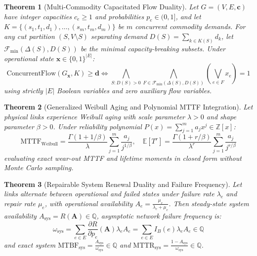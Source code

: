 \documentclass[10pt,journal,compsoc]{IEEEtran}
\newtheorem{theorem}{Theorem}
\begin{document}
\begin{theorem}[Multi-Commodity Capacitated Flow Duality]
Let $G = (V, E, \mathbf{c})$ have integer capacities $c_e \ge 1$ and probabilities $p_e \in (0, 1]$, and let $K = \{(s_1, t_1, d_1), \dots, (s_m, t_m, d_m)\}$ be $m$ concurrent commodity demands. For any cut partition $(S, V \setminus S)$ separating demand $D(S) = \sum_{k \in K(S)} d_k$, let $\mathcal{F}_{\text{min}}(\Delta(S), D(S))$ be the minimal capacity-breaking subsets. Under operational state $\mathbf{x} \in \{0, 1\}^{|E|}$:
\begin{equation}
\text{ConcurrentFlow}(G_{\mathbf{x}}, K) \ge \mathbf{d} \iff \bigwedge_{S: D(S) > 0} \bigwedge_{F \in \mathcal{F}_{\text{min}}(\Delta(S), D(S))} \left( \bigvee_{e \in F} x_e \right) = 1
\end{equation}
using strictly $|E|$ Boolean variables and zero auxiliary flow variables.
\end{theorem}

\begin{theorem}[Generalized Weibull Aging and Polynomial MTTF Integration]
Let physical links experience Weibull aging with scale parameter $\lambda > 0$ and shape parameter $\beta > 0$. Under reliability polynomial $P(x) = \sum_{j=1}^m a_j x^j \in \mathbb{Z}[x]$:
\begin{equation}
\text{MTTF}_{\text{Weibull}} = \frac{\Gamma(1 + 1/\beta)}{\lambda} \sum_{j=1}^m \frac{a_j}{j^{1/\beta}}, \quad \mathbb{E}[T^r] = \frac{\Gamma(1 + r/\beta)}{\lambda^r} \sum_{j=1}^m \frac{a_j}{j^{r/\beta}}
\end{equation}
evaluating exact wear-out MTTF and lifetime moments in closed form without Monte Carlo sampling.
\end{theorem}

\begin{theorem}[Repairable System Renewal Duality and Failure Frequency]
Let links alternate between operational and failed states under failure rate $\lambda_e$ and repair rate $\mu_e$, with operational availability $A_e = \frac{\mu_e}{\lambda_e + \mu_e}$.
Then steady-state system availability $A_{\text{sys}} = R(\mathbf{A}) \in \mathbb{Q}$, asymptotic network failure frequency is:
\begin{equation}
\omega_{\text{sys}} = \sum_{e \in E} \frac{\partial R}{\partial p_e}(\mathbf{A}) \lambda_e A_e = \sum_{e \in E} I_B(e) \lambda_e A_e \in \mathbb{Q}
\end{equation}
and exact system $\text{MTBF}_{\text{sys}} = \frac{A_{\text{sys}}}{\omega_{\text{sys}}} \in \mathbb{Q}$ and $\text{MTTR}_{\text{sys}} = \frac{1 - A_{\text{sys}}}{\omega_{\text{sys}}} \in \mathbb{Q}$.
\end{theorem}
\end{document}
